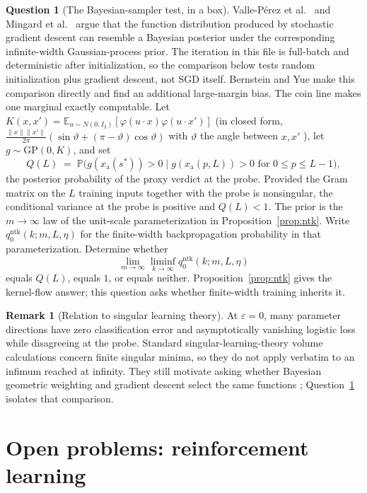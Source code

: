 \documentclass[11pt]{amsart}
\theoremstyle{plain}
\theoremstyle{definition}
\newtheorem{question}[theorem]{Question}
\newtheorem{remark}[theorem]{Remark}
\begin{document}
\begin{question}[The Bayesian-sampler test, in a box]\label{q:bayes}
Valle-P\'erez et al.~\cite{valleperez2019} and Mingard et al.~\cite{mingard2021} argue that the function distribution produced by stochastic gradient descent can resemble a Bayesian posterior under the corresponding infinite-width Gaussian-process prior. The iteration in this file is full-batch and deterministic after initialization, so the comparison below tests random initialization plus gradient descent, not SGD itself. Bernstein and Yue \cite{bernstein2022} make this comparison directly and find an additional large-margin bias. The coin line makes one marginal exactly computable. Let $K(x,x')=\mathbb E_{u\sim N(0,I_3)}[\varphi(u\cdot x)\varphi(u\cdot x')]$ (in closed form, $\frac{\|x\|\|x'\|}{2\pi}(\sin\vartheta+(\pi-\vartheta)\cos\vartheta)$ with $\vartheta$ the angle between $x,x'$ \cite{chosaul2009}), let $g\sim \mathrm{GP}(0,K)$, and set
\[
   Q(L)\;=\;\mathbb P\bigl(g(x_{\mathrm a}(s^{*}))>0 \;\big|\; g(x_{\mathrm a}(p,L))>0 \text{ for } 0\le p\le L-1\bigr),
\]
the posterior probability of the proxy verdict at the probe. Provided the Gram matrix on the $L$ training inputs together with the probe is nonsingular, the conditional variance at the probe is positive and $Q(L)<1$. The prior is the $m\to\infty$ law of the unit-scale parameterization in Proposition~\ref{prop:ntk}. Write $q^{\mathrm{ntk}}_0(k;m,L,\eta)$ for the finite-width backpropagation probability in that parameterization. Determine whether
\[
\lim_{m\to\infty}\liminf_{k\to\infty}q^{\mathrm{ntk}}_0(k;m,L,\eta)
\]
equals $Q(L)$, equals $1$, or equals neither. Proposition~\ref{prop:ntk} gives the kernel-flow answer; this question asks whether finite-width training inherits it.
\end{question}

\begin{remark}[Relation to singular learning theory]
At $\varepsilon=0$, many parameter directions have zero classification error and asymptotically vanishing logistic loss while disagreeing at the probe. Standard singular-learning-theory volume calculations concern finite singular minima, so they do not apply verbatim to an infimum reached at infinity. They still motivate asking whether Bayesian geometric weighting and gradient descent select the same functions \cite{watanabe2009,lehalleur2025}; Question~\ref{q:bayes} isolates that comparison.
\end{remark}

\section{Open problems: reinforcement learning}\label{sec:rl}
\end{document}
